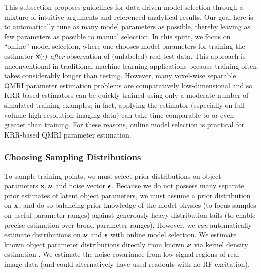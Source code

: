 This subsection proposes guidelines
for data-driven model selection
through a mixture
of intuitive arguments
and referenced analytical results.
Our goal here is
to automatically tune 
as many model parameters as possible,
thereby leaving as few parameters as possible
to manual selection. 
In this spirit,
we focus on ``online'' model selection,
where one chooses model parameters
for training the estimator $\esta{\bmx}{\cdot}$
\emph{after} observation 
of (unlabeled) real test data.
This approach is unconventional
in traditional machine learning applications
because training often takes 
considerably longer than testing.
However,
many voxel-wise separable QMRI parameter estimation problems
are comparatively low-dimensional
and so KRR-based estimators
can be quickly trained
using only a moderate number
of simulated training examples;
in fact,
applying the estimator
(especially on full-volume high-resolution imaging data)
can take time comparable to
or even greater than training.
For these reasons,
online model selection is practical
for KRR-based QMRI parameter estimation.

\subsubsection{Choosing Sampling Distributions}
\label{sss,krr,pract,mod,dist}

To sample training points,
we must select prior distributions
on object parameters $\mathbf{x},\boldsymbol{\nu}$ 
and noise vector $\boldsymbol{\epsilon}$.
Because we do not possess
many separate prior estimates
of latent object parameters,
we must assume a prior distribution on $\mathbf{x}$,
and do so 
balancing prior knowledge 
of the model physics 
(to focus samples
on useful parameter ranges)
against generously heavy distribution tails
(to enable precise estimation
over broad parameter ranges).
However, 
we \emph{can} automatically estimate distributions 
on $\boldsymbol{\nu}$ and $\boldsymbol{\epsilon}$ 
with online model selection.
We estimate known object parameter distributions
directly from known $\boldsymbol{\nu}$
via kernel density estimation \cite{parzen:62:oeo}.
We estimate the noise covariance
from low-signal regions 
of real image data
(and could alternatively have used 
readouts with no RF excitation).


